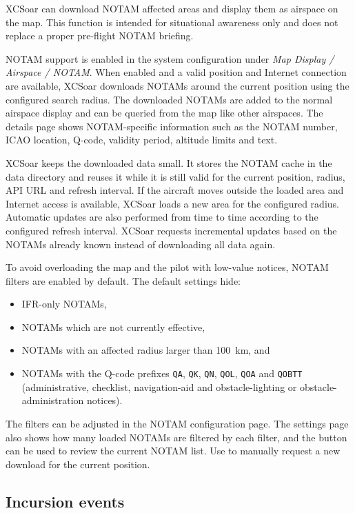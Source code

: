 XCSoar can download NOTAM affected areas and display them as airspace
on the map.  This function is intended for situational awareness only
and does not replace a proper pre-flight NOTAM briefing.

NOTAM support is enabled in the system configuration under
\emph{Map Display / Airspace / NOTAM}.  When enabled and a valid
position and Internet connection are available, XCSoar downloads NOTAMs
around the current position using the configured search radius.  The
downloaded NOTAMs are added to the normal airspace display and can be
queried from the map like other airspaces.  The details page shows
NOTAM-specific information such as the NOTAM number, ICAO location,
Q-code, validity period, altitude limits and text.

XCSoar keeps the downloaded data small.  It stores the NOTAM cache in
the data directory and reuses it while it is still valid for the current
position, radius, API URL and refresh interval.  If the aircraft moves
outside the loaded area and Internet access is available, XCSoar loads a
new area for the configured radius.  Automatic updates are also performed
from time to time according to the configured refresh interval.  XCSoar
requests incremental updates based on the NOTAMs already known instead of
downloading all data again.

To avoid overloading the map and the pilot with low-value notices,
NOTAM filters are enabled by default.  The default settings hide:
\begin{itemize}
\item IFR-only NOTAMs,
\item NOTAMs which are not currently effective,
\item NOTAMs with an affected radius larger than 100~km, and
\item NOTAMs with the Q-code prefixes \texttt{QA}, \texttt{QK},
  \texttt{QN}, \texttt{QOL}, \texttt{QOA} and \texttt{QOBTT}
  (administrative, checklist, navigation-aid and obstacle-lighting or
  obstacle-administration notices).
\end{itemize}

The filters can be adjusted in the NOTAM configuration page.  The
settings page also shows how many loaded NOTAMs are filtered by each
filter, and the  button can be used to review the current
NOTAM list.  Use  to manually request a new download for
the current position.


\subsection*{Incursion events}

